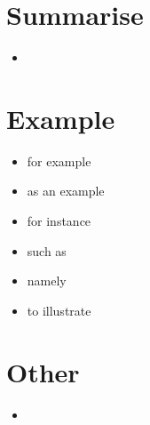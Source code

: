 \documentclass[twocolumn, a4paper]{article}
\begin{document}
\section{Summarise}
{\color{Plum}
	\begin{itemize}[leftmargin=*, noitemsep]
		\item
	\end{itemize}
}

\section{Example}
{\color{Orchid}
	\begin{itemize}[leftmargin=*, noitemsep]
		\item for example
		\item as an example
		\item for instance
		\item such as
		\item namely
		\item to illustrate
	\end{itemize}
}

\section{Other}
{\color{Rhodamine}
\begin{itemize}[leftmargin=*, noitemsep]
	\item
\end{itemize}
}





\begin{comment}
\begin{table}[h!]
	\centering
	\caption{EA comparisons}
	\begin{tabular}{cccccccccc}\toprule
		Constraint & Addition & Similar & Because & Emphasise & Contrast & Explain & Result & Time & Transition \\
		\midrule	
		met& & & & & & & & & \\
		fulfilled & & & & & & & & & \\
		& & & & & & & & & \\
		& & & & & & & & & \\
		& & & & & & & & & \\
		& & & & & & & & & \\
		& & & & & & & & & \\
		& & & & & & & & & \\
		& & & & & & & & & \\
		\bottomrule
	\end{tabular}	
	\label{table:words}
\end{table}

{\color{orange}
\begin{itemize}[leftmargin=*]
\item
\end{itemize}
}
\end{comment}








	
\end{document}
